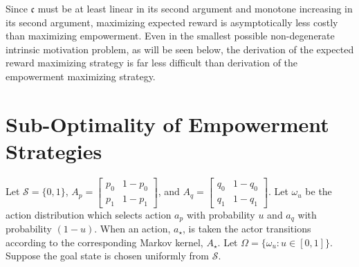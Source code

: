 \documentclass{article}
\newcommand{\Ss}{\mathcal{S}}
\begin{document}

Since $\mathfrak{c}$ must be at least linear in its second argument and monotone increasing in its second argument, maximizing expected reward is asymptotically less costly than maximizing empowerment. Even in the smallest possible non-degenerate intrinsic motivation problem, as will be seen below, the derivation of the expected reward maximizing strategy is far less difficult than derivation of the empowerment maximizing strategy.
\section{Sub-Optimality of Empowerment Strategies}
Let $\Ss=\{0,1\}$, $A_p=\left[\begin{matrix} p_0 & 1-p_0 \\ p_1 & 1-p_1\end{matrix}\right]$, and $A_q=\left[\begin{matrix} q_0 & 1-q_0 \\ q_1 & 1-q_1\end{matrix}\right]$. Let $\omega_u$ be the action distribution which selects action $a_p$ with probability $u$ and $a_q$ with probability $(1-u)$. When an action, $a_\star$, is taken the actor transitions according to the corresponding Markov kernel, $A_\star$. Let $\Omega=\{\omega_u:u\in[0,1]\}$. Suppose the goal state is chosen uniformly from $\Ss$.
\end{document}
